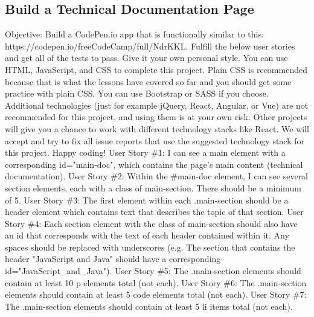 \documentclass{article}%
\begin{document}
\subsection{Build a Technical Documentation Page}%
\label{subsec:BuildaTechnicalDocumentationPage}%
Objective: Build a CodePen.io app that is functionally similar to this: https://codepen.io/freeCodeCamp/full/NdrKKL.\newline%
Fulfill the below user stories and get all of the tests to pass. Give it your own personal style.\newline%
You can use HTML, JavaScript, and CSS to complete this project. Plain CSS is recommended because that is what the lessons have covered so far and you should get some practice with plain CSS. You can use Bootstrap or SASS if you choose. Additional technologies (just for example jQuery, React, Angular, or Vue) are not recommended for this project, and using them is at your own risk. Other projects will give you a chance to work with different technology stacks like React. We will accept and try to fix all issue reports that use the suggested technology stack for this project. Happy coding!\newline%
User Story \#1: I can see a main element with a corresponding id="main{-}doc", which contains the page's main content (technical documentation).\newline%
User Story \#2: Within the \#main{-}doc element, I can see several section elements, each with a class of main{-}section. There should be a minimum of 5.\newline%
User Story \#3: The first element within each .main{-}section should be a header element which contains text that describes the topic of that section.\newline%
User Story \#4: Each section element with the class of main{-}section should also have an id that corresponds with the text of each header contained within it. Any spaces should be replaced with underscores (e.g. The section that contains the header "JavaScript and Java" should have a corresponding id="JavaScript\_and\_Java").\newline%
User Story \#5: The .main{-}section elements should contain at least 10 p elements total (not each).\newline%
User Story \#6: The .main{-}section elements should contain at least 5 code elements total (not each).\newline%
User Story \#7: The .main{-}section elements should contain at least 5 li items total (not each).\newline%
\end{document}
